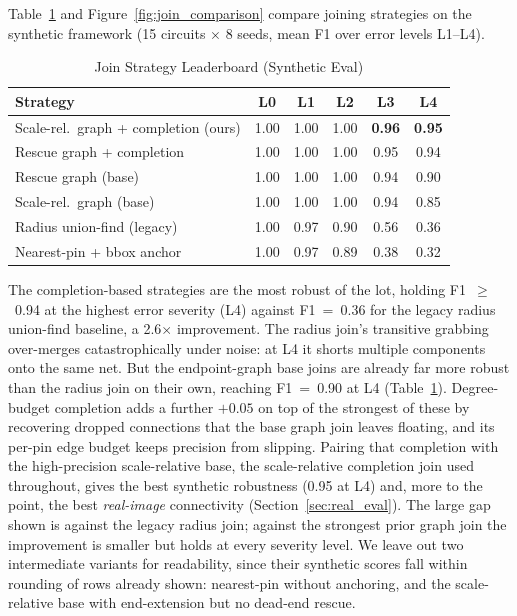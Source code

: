 \documentclass[journal]{IEEEtran}
\begin{document}
Table~\ref{tab:join_leaderboard} and Figure~\ref{fig:join_comparison} compare joining strategies on the synthetic framework (15 circuits $\times$ 8 seeds, mean F1 over error levels L1--L4).

\begin{table}[htbp]
\caption{Join Strategy Leaderboard (Synthetic Eval)}
\label{tab:join_leaderboard}
\begin{center}
\footnotesize
\setlength{\tabcolsep}{4pt}
\begin{tabular}{lccccc}
\toprule
\textbf{Strategy} & \textbf{L0} & \textbf{L1} & \textbf{L2} & \textbf{L3} & \textbf{L4} \\
\midrule
Scale-rel.\ graph + completion (ours) & 1.00 & 1.00 & 1.00 & \textbf{0.96} & \textbf{0.95} \\
Rescue graph + completion & 1.00 & 1.00 & 1.00 & 0.95 & 0.94 \\
Rescue graph (base) & 1.00 & 1.00 & 1.00 & 0.94 & 0.90 \\
Scale-rel.\ graph (base) & 1.00 & 1.00 & 1.00 & 0.94 & 0.85 \\
Radius union-find (legacy) & 1.00 & 0.97 & 0.90 & 0.56 & 0.36 \\
Nearest-pin + bbox anchor & 1.00 & 0.97 & 0.89 & 0.38 & 0.32 \\
\bottomrule
\end{tabular}
\end{center}
\end{table}

The completion-based strategies are the most robust of the lot, holding F1~$\geq$~0.94 at the highest error severity (L4) against F1~=~0.36 for the legacy radius union-find baseline, a 2.6$\times$ improvement. The radius join's transitive grabbing over-merges catastrophically under noise: at L4 it shorts multiple components onto the same net. But the endpoint-graph base joins are already far more robust than the radius join on their own, reaching F1~=~0.90 at L4 (Table~\ref{tab:join_leaderboard}). Degree-budget completion adds a further $+0.05$ on top of the strongest of these by recovering dropped connections that the base graph join leaves floating, and its per-pin edge budget keeps precision from slipping. Pairing that completion with the high-precision scale-relative base, the scale-relative completion join used throughout, gives the best synthetic robustness (0.95 at L4) and, more to the point, the best \emph{real-image} connectivity (Section~\ref{sec:real_eval}). The large gap shown is against the legacy radius join; against the strongest prior graph join the improvement is smaller but holds at every severity level. We leave out two intermediate variants for readability, since their synthetic scores fall within rounding of rows already shown: nearest-pin without anchoring, and the scale-relative base with end-extension but no dead-end rescue.
\end{document}
